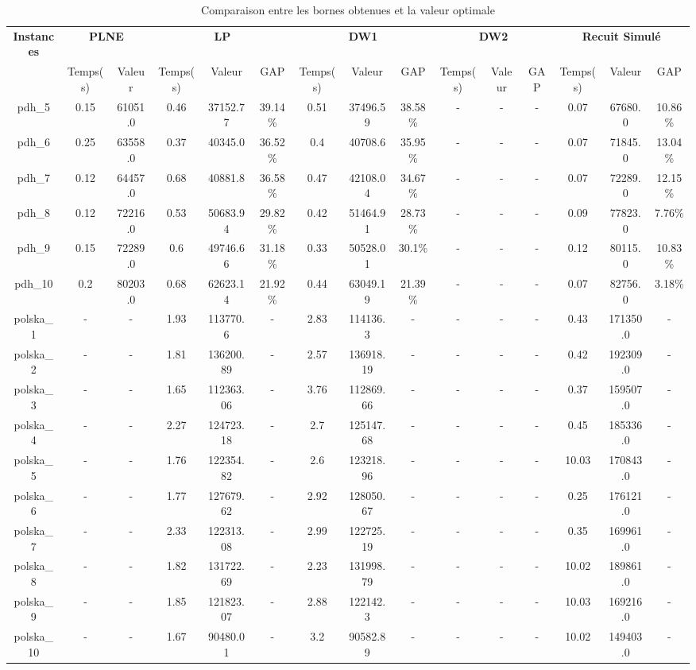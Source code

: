 \documentclass[main.tex]{subfiles}
\begin{document}
\newpage
\thispagestyle{empty}
\begin{landscape}
\begin{table}[h]
    \centering
    \begin{tabular}{c|cc|ccc|ccc|ccc|ccc}
	\hline	
	\textbf{Instances} &\multicolumn{2}{c}{\textbf{PLNE}} &\multicolumn{3}{c}{\textbf{LP}} &\multicolumn{3}{c}{\textbf{DW1}} &\multicolumn{3}{c}{\textbf{DW2}} &\multicolumn{3}{c}{\textbf{Recuit Simulé}}\\
	 &Temps(s) &Valeur &Temps(s) &Valeur &GAP &Temps(s) &Valeur &GAP &Temps(s) &Valeur &GAP &Temps(s) &Valeur &GAP\\

	\hline
	pdh\_5 &0.15 &61051.0 &0.46 &37152.77 &39.14\% &0.51 &37496.59 &38.58\% &- &- &- &0.07 &67680.0 &10.86\%\\
	pdh\_6 &0.25 &63558.0 &0.37 &40345.0 &36.52\% &0.4 &40708.6 &35.95\% &- &- &- &0.07 &71845.0 &13.04\%\\
	pdh\_7 &0.12 &64457.0 &0.68 &40881.8 &36.58\% &0.47 &42108.04 &34.67\% &- &- &- &0.07 &72289.0 &12.15\%\\
	pdh\_8 &0.12 &72216.0 &0.53 &50683.94 &29.82\% &0.42 &51464.91 &28.73\% &- &- &- &0.09 &77823.0 &7.76\%\\
	pdh\_9 &0.15 &72289.0 &0.6 &49746.66 &31.18\% &0.33 &50528.01 &30.1\% &- &- &- &0.12 &80115.0 &10.83\%\\
	pdh\_10 &0.2 &80203.0 &0.68 &62623.14 &21.92\% &0.44 &63049.19 &21.39\% &- &- &- &0.07 &82756.0 &3.18\%\\
	polska\_1 &- &- &1.93 &113770.6 &- &2.83 &114136.3 &- &- &- &- &0.43 &171350.0 &-\\
	polska\_2 &- &- &1.81 &136200.89 &- &2.57 &136918.19 &- &- &- &- &0.42 &192309.0 &-\\
	polska\_3 &- &- &1.65 &112363.06 &- &3.76 &112869.66 &- &- &- &- &0.37 &159507.0 &-\\
	polska\_4 &- &- &2.27 &124723.18 &- &2.7 &125147.68 &- &- &- &- &0.45 &185336.0 &-\\
	polska\_5 &- &- &1.76 &122354.82 &- &2.6 &123218.96 &- &- &- &- &10.03 &170843.0 &-\\
	polska\_6 &- &- &1.77 &127679.62 &- &2.92 &128050.67 &- &- &- &- &0.25 &176121.0 &-\\
	polska\_7 &- &- &2.33 &122313.08 &- &2.99 &122725.19 &- &- &- &- &0.35 &169961.0 &-\\
	polska\_8 &- &- &1.82 &131722.69 &- &2.23 &131998.79 &- &- &- &- &10.02 &189861.0 &-\\
	polska\_9 &- &- &1.85 &121823.07 &- &2.88 &122142.3 &- &- &- &- &10.03 &169216.0 &-\\
	polska\_10 &- &- &1.67 &90480.01 &- &3.2 &90582.89 &- &- &- &- &10.02 &149403.0 &-\\
\end{tabular}\caption{Comparaison entre les bornes obtenues et la valeur optimale}
\end{table}
\end{landscape}
\end{document}
